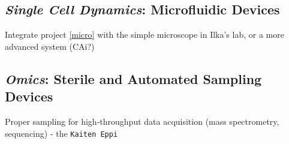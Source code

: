 \documentclass[12pt,a4paper]{scrartcl}
\begin{document}
\subsection{\textit{Single Cell Dynamics}: Microfluidic Devices}
Integrate project \ref{micro} with the simple microscope in
Ilka's lab, or a more advanced system (CAi?)


\subsection{\textit{Omics}: Sterile and Automated Sampling Devices}

Proper sampling for high-throughput data acquisition (mass
spectrometry, sequencing) - the \texttt{Kaiten Eppi}
\end{document}
